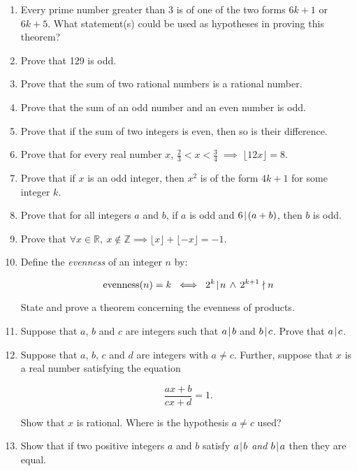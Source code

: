 \begin{enumerate}
\item Every prime number greater than 3 is of one of the two forms
$6k+1$ or $6k+5$.  What statement(s) could be used as hypotheses in
proving this theorem?

\item Prove that 129 is odd.

\item Prove that the sum of two rational numbers is a rational number.

\item Prove that the sum of an odd number and an even number is odd.

\item Prove that if the sum of two integers is even, then so is their
difference.

\item Prove that for every real number $x$, $\frac{2}{3} < x < \frac{3}{4} \; \implies \; \lfloor 12x \rfloor = 8$.

\item Prove that if $x$ is an odd integer, then $x^2$ is of the form
$4k+1$ for some integer $k$.

\item Prove that for all integers $a$ and $b$, if $a$ is odd and $6 \!\mid\! (a+b)$, then $b$ is odd.

\item Prove that $\forall x\in\mathbb{R},\ x\not\in\mathbb{Z}\implies\lfloor x\rfloor+\lfloor-x\rfloor=-1$.

\item Define the \emph{evenness} of an integer $n$ by:

\[ \mbox{evenness} (n) = k \; \iff \;  
 2^k \!\mid\! n \, \land \, 2^{k+1} \nmid n \]

State and prove a theorem concerning the evenness of products.


\item Suppose that $a$, $b$ and $c$ are integers such that $a \!\mid\! b$
and $b \!\mid\! c$.  Prove that $a \!\mid\! c$.

\item Suppose that $a$, $b$, $c$ and $d$ are integers with $a \neq c$.
Further, suppose that $x$ is a real number satisfying the equation

\[ \frac{ax+b}{cx+d} = 1. \]

\noindent Show that $x$ is rational.  Where is the hypothesis $a \neq c$
used?

\item Show that if two positive integers $a$ and $b$ satisfy $a \!\mid\! b$ \emph{and}
$b \!\mid\! a$ then they are equal.

\end{enumerate}
